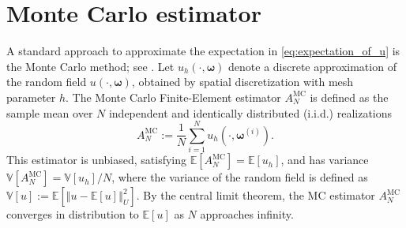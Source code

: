 
\section{Monte Carlo estimator}\label{sec:MC}

A standard approach to approximate the expectation in \eqref{eq:expectation_of_u} is the Monte Carlo method; see \cite{ElLiSa:2023,Gi:2008,Gi:2015,PeWiGu:2016}. Let $u_h (\cdot, \boldsymbol{\omega})$ denote a discrete approximation of the random field $u(\cdot, \boldsymbol{\omega})$, obtained by spatial discretization with mesh parameter $h$. The Monte Carlo Finite-Element estimator $A^{\text{MC}}_{N}$ is defined as the sample mean over $N$ independent and identically distributed (i.i.d.) realizations 
%
\begin{equation}\label{eq:MC_estimator}
    A^{\text{MC}}_{N} := \frac{1}{N}\sum_{i=1}^{N} u_{h}\left(\cdot, \boldsymbol{\omega}^{(i)}\right).
\end{equation}
%
This estimator is unbiased, satisfying $\mathbb{E}[A^{\text{MC}}_{N}] = \mathbb{E}[u_{h}]$, and has variance $\mathbb{V}[A^{\text{MC}}_{N}] = \mathbb{V}[u_{h}]/{N}$, where the variance of the random field is defined as $\mathbb{V}[u] := \mathbb{E}[\left\Vert u - \mathbb{E}[u]\right\Vert_U^2]$. By the central limit theorem, the MC estimator $A^{\text{MC}}_{N}$ converges in distribution to $\mathbb{E}[u]$ as $N$ approaches infinity. 

